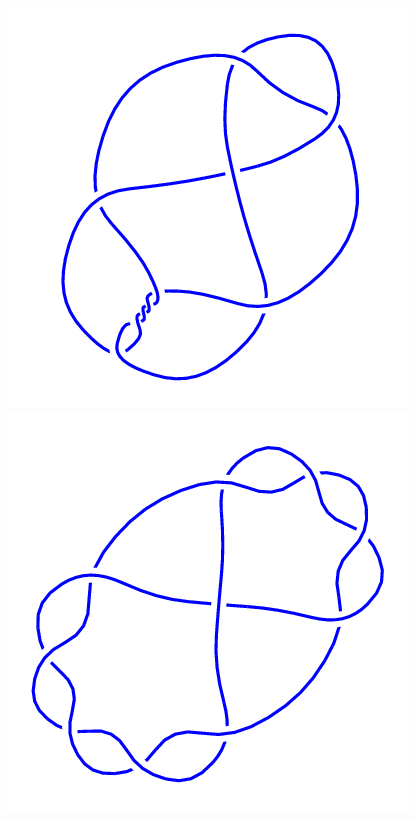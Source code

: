 \begin{figure}[H]
    \begin{minipage}[b]{.18\linewidth}
        \centering
        \includegraphics[width=\linewidth]{../data/10_7.png}
    \end{minipage}
    \begin{minipage}[b]{.18\linewidth}
        \centering
        \includegraphics[width=\linewidth]{../data/10_8.png}

\end{minipage}
\end{figure}
